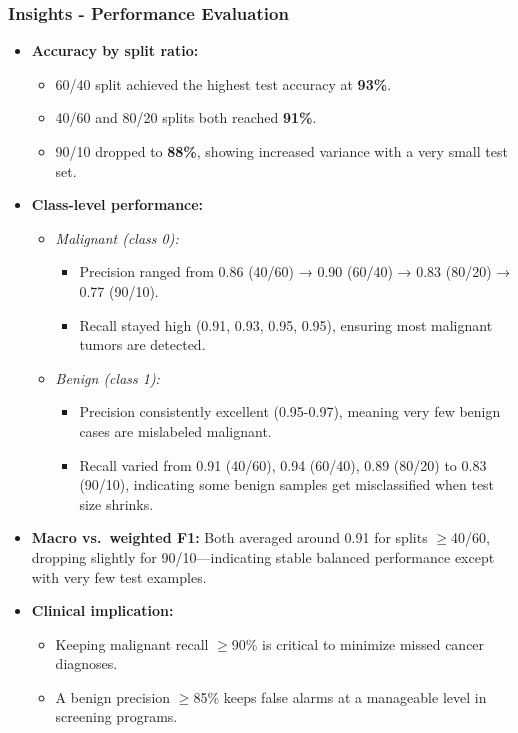 \subsubsection*{Insights - Performance Evaluation}
\begin{itemize}
	\item \textbf{Accuracy by split ratio:}
	      \begin{itemize}
		      \item 60/40 split achieved the highest test accuracy at \textbf{93\%}.
		      \item 40/60 and 80/20 splits both reached \textbf{91\%}.
		      \item 90/10 dropped to \textbf{88\%}, showing increased variance with a very small test set.
	      \end{itemize}
	\item \textbf{Class-level performance:}
	      \begin{itemize}
		      \item \emph{Malignant (class 0):}
		            \begin{itemize}
			            \item Precision ranged from 0.86 (40/60) → 0.90 (60/40) → 0.83 (80/20) → 0.77 (90/10).
			            \item Recall stayed high (0.91, 0.93, 0.95, 0.95), ensuring most malignant tumors are detected.
		            \end{itemize}
		      \item \emph{Benign (class 1):}
		            \begin{itemize}
			            \item Precision consistently excellent (0.95-0.97), meaning very few benign cases are mislabeled malignant.
			            \item Recall varied from 0.91 (40/60), 0.94 (60/40), 0.89 (80/20) to 0.83 (90/10), indicating some benign samples get misclassified when test size shrinks.
		            \end{itemize}
	      \end{itemize}
	\item \textbf{Macro vs.\ weighted F1:} Both averaged around 0.91 for splits \(\geq\)40/60, dropping slightly for 90/10—indicating stable balanced performance except with very few test examples.
	\item \textbf{Clinical implication:}
	      \begin{itemize}
		      \item Keeping malignant recall \(\geq\)90\% is critical to minimize missed cancer diagnoses.
		      \item A benign precision \(\geq\)85\% keeps false alarms at a manageable level in screening programs.
	      \end{itemize}
\end{itemize}

